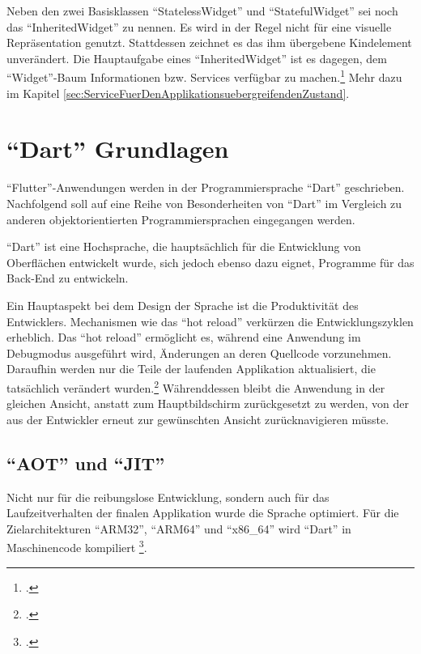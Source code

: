Neben den zwei Basisklassen \enquote{StatelessWidget} und \enquote{StatefulWidget} sei noch das \enquote{InheritedWidget} zu nennen.
Es wird in der Regel nicht für eine visuelle Repräsentation genutzt. Stattdessen zeichnet es das ihm übergebene Kindelement unverändert.
Die Hauptaufgabe eines \enquote{InheritedWidget} ist es dagegen, dem \enquote{Widget}-Baum Informationen bzw. Services verfügbar zu machen.\footcite[Vgl.][]{InheritedWidget}
Mehr dazu im Kapitel \ref{sec:ServiceFuerDenApplikationsuebergreifendenZustand}. 

\section{\enquote{Dart} Grundlagen}
\label{sec:Dart-Grundlagen}

\enquote{Flutter}-Anwendungen werden in der Programmiersprache \enquote{Dart} geschrieben.
Nachfolgend soll auf eine Reihe von Besonderheiten von \enquote{Dart} im Vergleich zu anderen objektorientierten Programmiersprachen eingegangen werden.

\enquote{Dart} ist eine Hochsprache, die hauptsächlich für die Entwicklung von Oberflächen entwickelt wurde, sich jedoch ebenso dazu eignet, Programme für das Back-End zu entwickeln.

Ein Hauptaspekt bei dem Design der Sprache ist die Produktivität des Entwicklers.
Mechanismen wie das \enquote{hot reload} verkürzen die Entwicklungszyklen erheblich.
Das \enquote{hot reload} ermöglicht es, während eine Anwendung im Debugmodus ausgeführt wird, Änderungen an deren Quellcode vorzunehmen.
Daraufhin werden nur die Teile der laufenden Applikation aktualisiert, die tatsächlich verändert wurden.\footcite[Vgl.][]{HotReload}
 Währenddessen bleibt die Anwendung in der gleichen Ansicht, anstatt zum Hauptbildschirm zurückgesetzt zu werden, von der aus der Entwickler erneut zur gewünschten Ansicht zurücknavigieren müsste.

\subsection{\enquote{AOT} und \enquote{JIT}}
Nicht nur für die reibungslose Entwicklung, sondern auch für das Laufzeitverhalten der finalen Applikation wurde die Sprache optimiert.
Für die Zielarchitekturen \enquote{ARM32}, \enquote{ARM64} und \enquote{x86_64} wird \enquote{Dart} in Maschinencode kompiliert \footcite[Vgl.][]{DartThePlatforms}.


